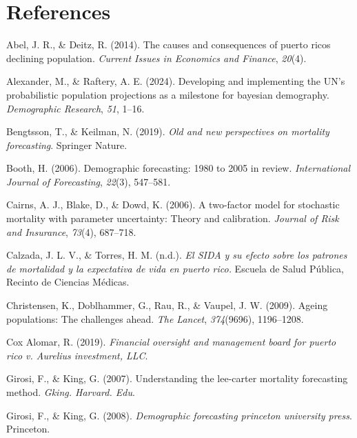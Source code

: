 \documentclass[
  12pt,
]{report}
\newlength{\cslhangindent}
\newenvironment{CSLReferences}[2] %
 {\begin{list}{}{%
  \setlength{\itemindent}{0pt}
  \setlength{\leftmargin}{0pt}
  \setlength{\parsep}{0pt}
  \ifodd #1
   \setlength{\leftmargin}{\cslhangindent}
   \setlength{\itemindent}{-1\cslhangindent}
  \fi
  \setlength{\itemsep}{#2\baselineskip}}}
 {\end{list}}
\begin{document}
\chapter{References}\label{references}

\label{refs}
\begin{CSLReferences}{1}{0}
Abel, J. R., \& Deitz, R. (2014). The causes and consequences of puerto
ricos declining population. \emph{Current Issues in Economics and
Finance}, \emph{20}(4).

Alexander, M., \& Raftery, A. E. (2024). Developing and implementing the
UN's probabilistic population projections as a milestone for bayesian
demography. \emph{Demographic Research}, \emph{51}, 1--16.

Bengtsson, T., \& Keilman, N. (2019). \emph{Old and new perspectives on
mortality forecasting}. Springer Nature.

Booth, H. (2006). Demographic forecasting: 1980 to 2005 in review.
\emph{International Journal of Forecasting}, \emph{22}(3), 547--581.

Cairns, A. J., Blake, D., \& Dowd, K. (2006). A two-factor model for
stochastic mortality with parameter uncertainty: Theory and calibration.
\emph{Journal of Risk and Insurance}, \emph{73}(4), 687--718.

Calzada, J. L. V., \& Torres, H. M. (n.d.). \emph{El {SIDA} y su efecto
sobre los patrones de mortalidad y la expectativa de vida en puerto
rico.} Escuela de Salud Pública, Recinto de Ciencias Médicas.

Christensen, K., Doblhammer, G., Rau, R., \& Vaupel, J. W. (2009).
Ageing populations: The challenges ahead. \emph{The Lancet},
\emph{374}(9696), 1196--1208.

Cox Alomar, R. (2019). \emph{Financial oversight and management board
for puerto rico v. Aurelius investment, LLC}.

Girosi, F., \& King, G. (2007). Understanding the lee-carter mortality
forecasting method. \emph{Gking. Harvard. Edu}.

Girosi, F., \& King, G. (2008). \emph{Demographic forecasting princeton
university press}. Princeton.


\end{CSLReferences}
\end{document}
